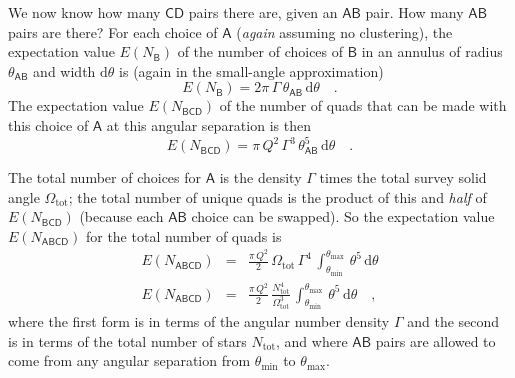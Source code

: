 \documentclass[letterpaper]{article}
\newcommand{\starlabel}[1]{\mathsf{#1}}
\newcommand{\AAA}{\starlabel{A}}
\newcommand{\BBB}{\starlabel{B}}
\newcommand{\CCC}{\starlabel{C}}
\newcommand{\DDD}{\starlabel{D}}
\newcommand{\thetaAB}{\theta_{\AAA\BBB}}
\newcommand{\dtheta}{\mathrm{d}\theta}
\newcommand{\ENB}{E(N_{\BBB})}
\newcommand{\ENBCD}{E(N_{\BBB\CCC\DDD})}
\newcommand{\ENABCD}{E(N_{\AAA\BBB\CCC\DDD})}
\newcommand{\Ntotal}{N_\mathrm{tot}}
\newcommand{\Omegatotal}{\Omega_\mathrm{tot}}
\newcommand{\thetamin}{\theta_\mathrm{min}}
\newcommand{\thetamax}{\theta_\mathrm{max}}
\begin{document}
We now know how many $\CCC\DDD$ pairs there are, given an $\AAA\BBB$
pair.  How many $\AAA\BBB$ pairs are there?  For each choice of $\AAA$
(\emph{again} assuming no clustering), the expectation value $\ENB$ of
the number of choices of $\BBB$ in an annulus of radius $\thetaAB$ and
width $\dtheta$ is (again in the small-angle approximation)
\begin{equation}
\ENB = 2\pi\,\Gamma\,\thetaAB\,\dtheta \quad .
\end{equation}
The expectation value $\ENBCD$ of the number of quads that can be made
with this choice of $\AAA$ at this angular separation is then
\begin{equation}
\ENBCD = \pi\,Q^2\,\Gamma^3\,\thetaAB^5\,\dtheta \quad .
\end{equation}

The total number of choices for $\AAA$ is the density $\Gamma$ times
the total survey solid angle $\Omegatotal$; the total number of unique
quads is the product of this and \emph{half} of $\ENBCD$ (because each
$\AAA\BBB$ choice can be swapped).  So the expectation value $\ENABCD$
for the total number of quads is
\begin{eqnarray}\displaystyle
\ENABCD & = & \frac{\pi\,Q^2}{2}\,\Omegatotal\,\Gamma^4\,
                \int_{\thetamin}^{\thetamax}\,\theta^5\,\dtheta \\
\ENABCD & = & \frac{\pi\,Q^2}{2}\,\frac{\Ntotal^4}{\Omegatotal^3}\,
                \int_{\thetamin}^{\thetamax}\,\theta^5\,\dtheta \quad ,
\end{eqnarray}
where the first form is in terms of the angular number density
$\Gamma$ and the second is in terms of the total number of stars
$\Ntotal$, and where $\AAA\BBB$ pairs are allowed to come from any
angular separation from $\thetamin$ to $\thetamax$.
\end{document}
